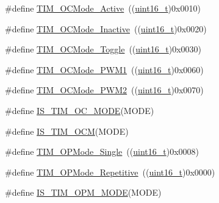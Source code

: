 \begin{DoxyCompactItemize}
\item 
\#define \hyperlink{group___t_i_m___output___compare__and___p_w_m__modes_ga76bac57d41dc67218772f9c745c77102}{T\+I\+M\+\_\+\+O\+C\+Mode\+\_\+\+Active}~((\hyperlink{_p_e___types_8h_a1f1825b69244eb3ad2c7165ddc99c956}{uint16\+\_\+t})0x0010)
\item 
\#define \hyperlink{group___t_i_m___output___compare__and___p_w_m__modes_gae0c350d7adaea14a37cabc2ab762695f}{T\+I\+M\+\_\+\+O\+C\+Mode\+\_\+\+Inactive}~((\hyperlink{_p_e___types_8h_a1f1825b69244eb3ad2c7165ddc99c956}{uint16\+\_\+t})0x0020)
\item 
\#define \hyperlink{group___t_i_m___output___compare__and___p_w_m__modes_ga8b8adb6e81fe88bd14d44430f7f97021}{T\+I\+M\+\_\+\+O\+C\+Mode\+\_\+\+Toggle}~((\hyperlink{_p_e___types_8h_a1f1825b69244eb3ad2c7165ddc99c956}{uint16\+\_\+t})0x0030)
\item 
\#define \hyperlink{group___t_i_m___output___compare__and___p_w_m__modes_gaefbe32dddc9630fbcc48b302b50d15fc}{T\+I\+M\+\_\+\+O\+C\+Mode\+\_\+\+P\+W\+M1}~((\hyperlink{_p_e___types_8h_a1f1825b69244eb3ad2c7165ddc99c956}{uint16\+\_\+t})0x0060)
\item 
\#define \hyperlink{group___t_i_m___output___compare__and___p_w_m__modes_ga722d8f33a795ef82ed7ae76dfbb7613d}{T\+I\+M\+\_\+\+O\+C\+Mode\+\_\+\+P\+W\+M2}~((\hyperlink{_p_e___types_8h_a1f1825b69244eb3ad2c7165ddc99c956}{uint16\+\_\+t})0x0070)
\item 
\#define \hyperlink{group___t_i_m___output___compare__and___p_w_m__modes_ga93d898976e236c135bfd02a0c213c8ec}{I\+S\+\_\+\+T\+I\+M\+\_\+\+O\+C\+\_\+\+M\+O\+DE}(M\+O\+DE)
\item 
\#define \hyperlink{group___t_i_m___output___compare__and___p_w_m__modes_ga45f530dd241d3b0787b5c2d62cd1b98f}{I\+S\+\_\+\+T\+I\+M\+\_\+\+O\+CM}(M\+O\+DE)
\item 
\#define \hyperlink{group___t_i_m___one___pulse___mode_ga99d934fdbc54ea4ee2cf5c86860f9227}{T\+I\+M\+\_\+\+O\+P\+Mode\+\_\+\+Single}~((\hyperlink{_p_e___types_8h_a1f1825b69244eb3ad2c7165ddc99c956}{uint16\+\_\+t})0x0008)
\item 
\#define \hyperlink{group___t_i_m___one___pulse___mode_gad921d739c86bf48dca12442a81ad68ad}{T\+I\+M\+\_\+\+O\+P\+Mode\+\_\+\+Repetitive}~((\hyperlink{_p_e___types_8h_a1f1825b69244eb3ad2c7165ddc99c956}{uint16\+\_\+t})0x0000)
\item 
\#define \hyperlink{group___t_i_m___one___pulse___mode_ga3f4a4305b4feacb4322eb4a358e54637}{I\+S\+\_\+\+T\+I\+M\+\_\+\+O\+P\+M\+\_\+\+M\+O\+DE}(M\+O\+DE)
\item 

\end{DoxyCompactItemize}
